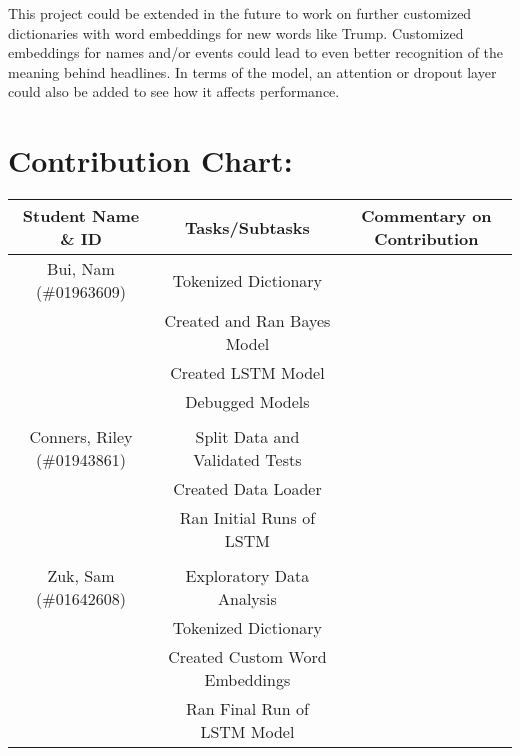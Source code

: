 \documentclass[11pt]{article}
\begin{document}
This project could be extended in the future to work on further customized dictionaries with word embeddings for new words like Trump. Customized embeddings for names and/or events could lead to even better recognition of the meaning behind headlines. In terms of the model, an attention or dropout layer could also be added to see how it affects performance.

\section{Contribution Chart:}

\begin{table}[H]
    \centering
    \begin{tabular}{c|c|c}
        Student Name \& ID          & Tasks/Subtasks                 & Commentary on Contribution \\
        \hline
        Bui, Nam (\#01963609)       & Tokenized Dictionary           &                            \\
                                    & Created and Ran Bayes Model    &                            \\
                                    & Created LSTM Model             &                            \\
                                    & Debugged Models                &                            \\
                                    &                                &                            \\
        \hline
        Conners, Riley (\#01943861) & Split Data and Validated Tests &                            \\
                                    & Created Data Loader            &                            \\
                                    & Ran Initial Runs of LSTM       &                            \\
                                    &                                &                            \\
        \hline
        Zuk, Sam (\#01642608)       & Exploratory Data Analysis      &                            \\
                                    & Tokenized Dictionary           &                            \\
                                    & Created Custom Word Embeddings &                            \\
                                    & Ran Final Run of LSTM Model    &                            \\
    \end{tabular}
    \label{tab:my_label}
\end{table}



\end{document}
